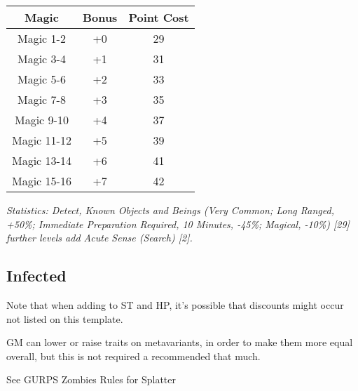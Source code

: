 \begin{multicols*}{3}
	\begin{center}
		\begin{tabular}{|c|c|c|}
			\hline
			Magic & Bonus & Point Cost\\
			\hline
			\hline
			Magic 1-2 & +0 & 29 \\
			Magic 3-4 & +1 & 31 \\
			Magic 5-6 & +2 & 33 \\
			Magic 7-8 & +3 & 35 \\
			Magic 9-10 & +4 & 37 \\
			Magic 11-12 & +5 & 39 \\
			Magic 13-14 & +6 & 41 \\
			Magic 15-16 & +7 & 42 \\
			\hline
		\end{tabular}
	\end{center}
	
	\textcolor{OliveGreen}{\textit{Statistics: Detect, Known Objects and Beings (Very Common; Long Ranged, +50\%; Immediate Preparation Required, 10 Minutes, -45\%; Magical, -10\%) [29] further levels add Acute Sense (Search) [2].}}
	
	\subsection{Infected}
	
	Note that when adding to ST and HP, it's possible that discounts might occur not listed on this template.
	
	GM can lower or raise traits on metavariants, in order to make them more equal overall, but this is not required a recommended that much.
	
	See GURPS Zombies Rules for Splatter
	

\end{multicols*}
